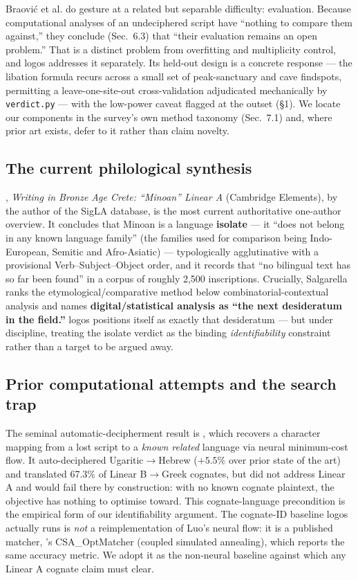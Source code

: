 Braovi\'{c} et al. do gesture at a related but separable difficulty:
evaluation. Because computational analyses of an undeciphered script have
``nothing to compare them against,'' they conclude (Sec.~6.3) that
``their evaluation remains an open problem.'' That is a distinct problem
from overfitting and multiplicity control, and logos addresses it
separately. Its held-out design is a concrete response --- the libation
formula recurs across a small set of peak-sanctuary and cave findspots,
permitting a leave-one-site-out cross-validation adjudicated mechanically
by \texttt{verdict.py} --- with the low-power caveat flagged at the
outset (\S1). We locate our components in the survey's own
method taxonomy (Sec.~7.1) and, where prior art exists, defer to it
rather than claim novelty.

\subsection{The current philological synthesis}

\citet{salgarella2025}, \emph{Writing in Bronze Age Crete: ``Minoan''
Linear A} (Cambridge Elements), by the author of the SigLA database, is
the most current authoritative one-author overview. It concludes that
Minoan is a language \textbf{isolate} --- it ``does not belong in any
known language family'' (the families used for comparison being
Indo-European, Semitic and Afro-Asiatic) --- typologically agglutinative
with a provisional Verb--Subject--Object order, and it records that ``no
bilingual text has so far been found'' in a corpus of roughly 2,500
inscriptions. Crucially, Salgarella ranks the etymological/comparative
method below combinatorial-contextual analysis and names
\textbf{digital/statistical analysis as ``the next desideratum in the
field.''} logos positions itself as exactly that desideratum --- but
under discipline, treating the isolate verdict as the binding
\emph{identifiability} constraint rather than a target to be argued away.

\subsection{Prior computational attempts and the search trap}

The seminal automatic-decipherment result is \citet{luo2019}, which
recovers a character mapping from a lost script to a \emph{known related}
language via neural minimum-cost flow. It auto-deciphered
Ugaritic$\rightarrow$Hebrew ($+5.5\%$ over prior state of the art) and
translated 67.3\% of Linear B$\rightarrow$Greek cognates, but did not
address Linear A and would fail there by construction: with no known
cognate plaintext, the objective has nothing to optimise toward. This
cognate-language precondition is the empirical form of our
identifiability argument. The cognate-ID baseline logos actually runs is
\emph{not} a reimplementation of Luo's neural flow: it is a published
matcher, \citeauthor{tamburini2025}'s \citeyearpar{tamburini2025}
CSA\_OptMatcher (coupled simulated annealing), which reports the same
\citet{luo2019} accuracy metric. We adopt it as the non-neural baseline
against which any Linear A cognate claim must clear.

